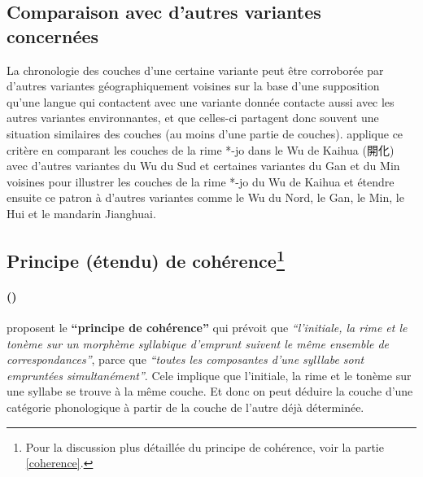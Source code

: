 \documentclass{scrbook}
\newcounter{c}[subsubsection]
\newcommand{\stpc}[1]{\stepcounter{#1}}
\begin{document}
\begin{sloppypar}
\subsection{Comparaison avec d'autres variantes concernées}
La chronologie des couches d'une certaine variante peut être corroborée par d'autres variantes géographiquement voisines sur la base d'une supposition qu'une langue qui contactent avec une variante donnée contacte aussi avec les autres variantes environnantes, et que celles-ci partagent donc souvent une situation similaires des couches (au moins d'une partie de couches). \textcite{Chen2003yu} applique ce critère en comparant les couches de la rime *-jo dans le Wu de Kaihua (開化) avec d'autres variantes du Wu du Sud et certaines variantes du Gan et du Min voisines pour illustrer les couches de la rime *-jo du Wu de Kaihua et étendre ensuite ce patron à d'autres variantes comme le Wu du Nord, le Gan, le Min, le Hui et le mandarin Jianghuai. 

\subsection[Principe (étendu) de cohérence]{Principe (étendu) de cohérence\footnote{Pour la discussion plus détaillée du principe de cohérence, voir la partie \ref{coherence}.}}\label{coherence_(étendu)}%

\stpc{c}\paragraph{()}
\textcite[15]{Sagart2001hani} proposent le \textbf{``principe de cohérence''} qui prévoit que \textit{``l'initiale, la rime et le tonème sur un morphème syllabique d'emprunt suivent le même ensemble de correspondances''}, parce que \textit{``toutes les composantes d'une sylllabe sont empruntées simultanément''}. Cele implique que l'initiale, la rime et le tonème sur une syllabe se trouve à la même couche. Et donc on peut déduire la couche d'une catégorie phonologique à partir de la couche de l'autre déjà déterminée.


\end{sloppypar}
\end{document}
